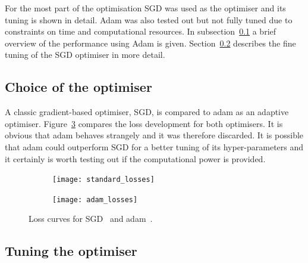 For the most part of the optimisation SGD was used as the optimiser and its tuning is shown in detail.
Adam was also tested out but not fully tuned due to constraints on time and computational resources.
In subsection~\ref{sec:optimiser:choice} a brief overview of the performance using Adam is given. Section~\ref{sec:optimiser:tuning} describes the fine tuning of the SGD optimiser in more detail.

\subsection{Choice of the optimiser}
\label{sec:optimiser:choice}

A classic gradient-based optimiser, SGD, is compared to adam as an adaptive optimiser. Figure~\ref{fig:opti} compares the loss development for both optimisers. It is obvious that adam behaves strangely and it was therefore discarded. It is possible that adam could outperform SGD for a better tuning of its hyper-parameters and it certainly is worth testing out if the computational power is provided.

\begin{figure}[htbp]
    \centering
    \begin{subfigure}[b]{0.48\textwidth}
        \texttt{[image: standard\_losses]}
        \caption{}
        \label{fig:opti:standard}
    \end{subfigure}
\quad
    \begin{subfigure}[b]{0.48\textwidth}
        \texttt{[image: adam\_losses]}
        \caption{}
        \label{fig:opti:adam}
    \end{subfigure}
    \caption{Loss curves for SGD~ and adam~.}
	\label{fig:opti}
\end{figure}

\subsection{Tuning the optimiser}
\label{sec:optimiser:tuning}

